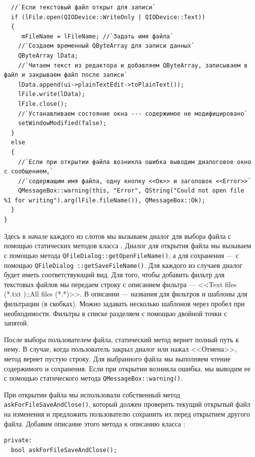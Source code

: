 \begin{lstlisting}
  //`Если текстовый файл открыт для записи`
  if (lFile.open(QIODevice::WriteOnly | QIODevice::Text))
  { 
     mFileName = lFileName; //`Задать имя файла`
    //`Создаем временный QByteArray для записи данных`
    QByteArray lData; 
    //`Читаем текст из редактора и добавляем QByteArray, записываем в файл и закрываем файл после записи` 
    lData.append(ui->plainTextEdit->toPlainText());
    lFile.write(lData);
    lFile.close();
    //`Устанавливаем состояние окна --- содержимое не модифицировано`
    setWindowModified(false);
  }
  else
  {
    //`Если при открытии файла возникла ошибка выводим диалоговое окно с сообщением,`
    //`содержащим имя файла, одну кнопку <<Ок>> и заголовок <<Error>>` 
    QMessageBox::warning(this, "Error", QString("Could not open file %1 for writing").arg(lFile.fileName()), QMessageBox::Ok);
  }
}
\end{lstlisting}

Здесь в начале каждого из слотов мы вызываем диалог для выбора файла с помощью статических методов класса .
Диалог для открытия файла мы вызываем с помощью метода \lstinline!QFileDialog::getOpenFileName()!, а для сохранения --- с помощью
\lstinline!QFileDialog ::getSaveFileName()!. Для каждого из случаев диалог будет иметь соответствующий вид. Для того, чтобы
добавить фильтр для текстовых файлов мы передаем строку с описанием фильтра --- <<Text files (*.txt );;All files
(*.*)>>. В описании --- названия для фильтров и шаблоны для фильтрации (в скобках). Можно задавать несколько
шаблонов через пробел при необходимости. Фильтры в списке разделяем с помощью двойной точки с запятой. 

После выбора пользователем файла, статический метод вернет полный путь к нему. В случае, когда пользователь закрыл
диалог или нажал <<Отмена>>, метод вернет пустую строку. Для выбранного файла мы выполняем чтение
содержимого и сохранения. Если при открытии возникла ошибка, мы выводим ее с помощью статического метода
\lstinline!QMessageBox::warning()!. 

При открытии файла мы использовали собственный метод \lstinline!askForFileSaveAndClose()!, который должен проверить текущий открытый
файл на изменения и предложить пользователю сохранить их перед открытием другого файла. Добавим описание этого метода к
описанию класса : 
\begin{lstlisting}
private:
  bool askForFileSaveAndClose();
\end{lstlisting}


